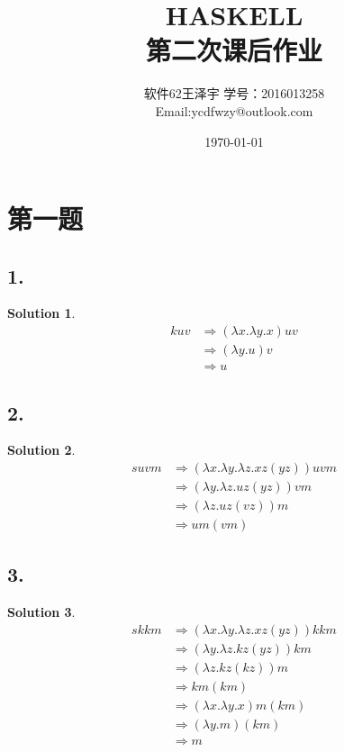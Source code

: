 \documentclass[UTF8]{article}
\title{HASKELL \\ \Large{第二次课后作业}}
\author{软件62王泽宇 \qquad 学号：2016013258 \\ Email:ycdfwzy@outlook.com}
\date{\today}
\newtheorem{Solution}{Solution}
\begin{document}
\maketitle
\section{第一题}
    \subsection*{1.}
        \begin{Solution}
            \begin{equation*}
                \begin{split}
                    k u v &\Rightarrow (\lambda x.\lambda y.x)uv\\
                    &\Rightarrow (\lambda y.u)v\\
                    &\Rightarrow u
                \end{split}
            \end{equation*}
        \end{Solution}
    \subsection*{2.}
        \begin{Solution}
            \begin{equation*}
                \begin{split}
                    s u v m &\Rightarrow (\lambda x.\lambda y.\lambda z.xz(yz))uvm\\
                    &\Rightarrow (\lambda y.\lambda z.uz(yz))vm\\
                    &\Rightarrow (\lambda z.uz(vz))m\\
                    &\Rightarrow um(vm)
                \end{split}
            \end{equation*}
        \end{Solution}
    \subsection*{3.}
        \begin{Solution}
            \begin{equation*}
                \begin{split}
                    s k k m &\Rightarrow (\lambda x.\lambda y.\lambda z.xz(yz))kkm\\
                    &\Rightarrow (\lambda y.\lambda z.kz(yz))km\\
                    &\Rightarrow (\lambda z.kz(kz))m\\
                    &\Rightarrow km(km)\\
                    &\Rightarrow (\lambda x.\lambda y.x)m(km)\\
                    &\Rightarrow (\lambda y.m)(km)\\
                    &\Rightarrow m
                \end{split}
            \end{equation*}
        \end{Solution}
\end{document}

